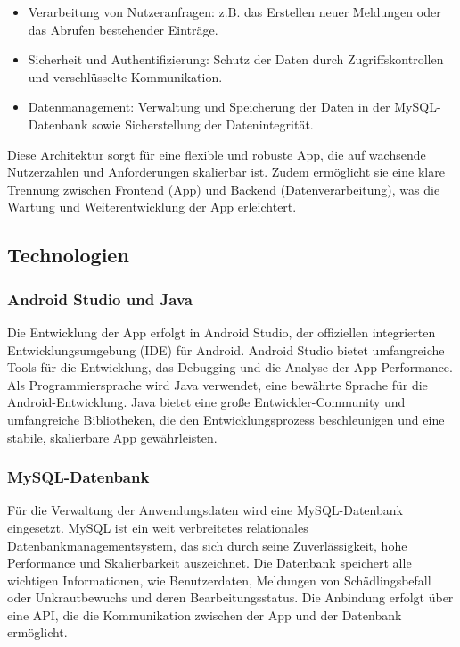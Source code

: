 \begin{itemize}
    \item Verarbeitung von Nutzeranfragen: z.B. das Erstellen neuer Meldungen oder das Abrufen bestehender Einträge.
    \item Sicherheit und Authentifizierung: Schutz der Daten durch Zugriffskontrollen und verschlüsselte Kommunikation.
    \item Datenmanagement: Verwaltung und Speicherung der Daten in der MySQL-Datenbank sowie Sicherstellung der Datenintegrität.
\end{itemize}

Diese Architektur sorgt für eine flexible und robuste App, die auf wachsende Nutzerzahlen und Anforderungen skalierbar ist. Zudem ermöglicht sie eine klare Trennung zwischen Frontend (App) und Backend (Datenverarbeitung), was die Wartung und Weiterentwicklung der App erleichtert.

\subsection{Technologien}

\subsubsection{Android Studio und Java}

Die Entwicklung der App erfolgt in Android Studio, der offiziellen integrierten Entwicklungsumgebung (IDE) für Android. Android Studio bietet umfangreiche Tools für die Entwicklung, das Debugging und die Analyse der App-Performance. Als Programmiersprache wird Java verwendet, eine bewährte Sprache für die Android-Entwicklung. Java bietet eine große Entwickler-Community und umfangreiche Bibliotheken, die den Entwicklungsprozess beschleunigen und eine stabile, skalierbare App gewährleisten.

\subsubsection{MySQL-Datenbank}

Für die Verwaltung der Anwendungsdaten wird eine MySQL-Datenbank eingesetzt. MySQL ist ein weit verbreitetes relationales Datenbankmanagementsystem, das sich durch seine Zuverlässigkeit, hohe Performance und Skalierbarkeit auszeichnet. Die Datenbank speichert alle wichtigen Informationen, wie Benutzerdaten, Meldungen von Schädlingsbefall oder Unkrautbewuchs und deren Bearbeitungsstatus. Die Anbindung erfolgt über eine API, die die Kommunikation zwischen der App und der Datenbank ermöglicht.

